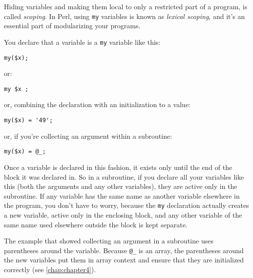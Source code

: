 Hiding variables and making them local to only a restricted part of a program, is called \textit{scoping}. In Perl, using \verb|my| variables is known as \textit{lexical scoping}, and it's an essential part of modularizing your programs.

You declare that a variable is a \verb|my| variable like this:

\begin{lstlisting}
my($x); 
\end{lstlisting}

or:

\begin{lstlisting}
my $x ; 
\end{lstlisting}

or, combining the declaration with an initialization to a value:

\begin{lstlisting}
my($x) = '49'; 
\end{lstlisting}

or, if you're collecting an argument within a subroutine:

\begin{lstlisting}
my($x) = @_; 
\end{lstlisting}

Once a variable is declared in this fashion, it exists only until the end of the block it was declared in. So in a subroutine, if you declare all your variables like this (both the arguments and any other variables), they are active only in the subroutine. If any variable has the same name as another variable elsewhere in the program, you don't have to worry, because the \verb|my| declaration actually creates a new variable, active only in the enclosing block, and any other variable of the same name used elsewhere outside the block is kept separate.

The example that showed collecting an argument in a subroutine uses parentheses around the variable. Because \verb|@_| is an array, the parentheses around the new variables put them in array context and ensure that they are initialized correctly (see \autoref{chap:chapter4}).


